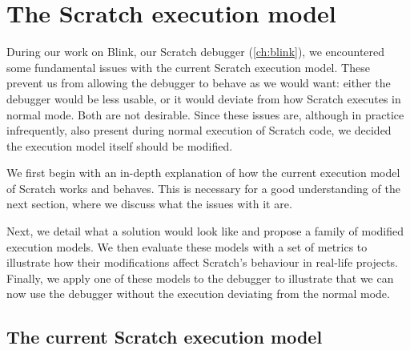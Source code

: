 \documentclass[../main]{subfiles}
\begin{document}
\chapter{The Scratch execution model}\label{ch:scratch-execution-model}

During our work on Blink, our Scratch debugger (\vref{ch:blink}), we encountered some fundamental issues with the current Scratch execution model.
These prevent us from allowing the debugger to behave as we would want: either the debugger would be less usable, or it would deviate from how Scratch executes in normal mode.
Both are not desirable.
Since these issues are, although in practice infrequently, also present during normal execution of Scratch code, we decided the execution model itself should be modified.

We first begin with an in-depth explanation of how the current execution model of Scratch works and behaves.
This is necessary for a good understanding of the next section, where we discuss what the issues with it are.

Next, we detail what a solution would look like and propose a family of modified execution models.
We then evaluate these models with a set of metrics to illustrate how their modifications affect Scratch's behaviour in real-life projects.
Finally, we apply one of these models to the debugger to illustrate that we can now use the debugger without the execution deviating from the normal mode.

\section{The current Scratch execution model}\label{sec:the-current-scratch-execution-model}
\end{document}
